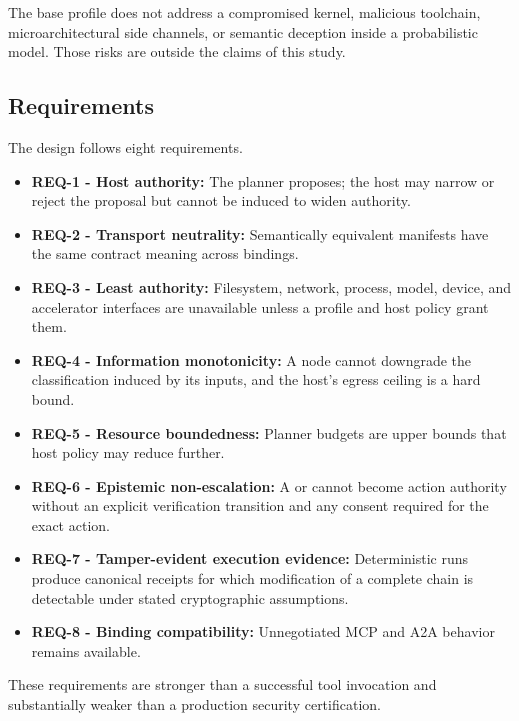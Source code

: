 The base profile does not address a compromised kernel, malicious toolchain, microarchitectural side channels, or semantic deception inside a probabilistic model. Those risks are outside the claims of this study.

\subsection{Requirements}
The design follows eight requirements.
\begin{itemize}
  \item \textbf{REQ-1 - Host authority:} The planner proposes; the host may narrow or reject the proposal but cannot be induced to widen authority.
  \item \textbf{REQ-2 - Transport neutrality:} Semantically equivalent manifests have the same contract meaning across bindings.
  \item \textbf{REQ-3 - Least authority:} Filesystem, network, process, model, device, and accelerator interfaces are unavailable unless a profile and host policy grant them.
  \item \textbf{REQ-4 - Information monotonicity:} A node cannot downgrade the classification induced by its inputs, and the host's egress ceiling is a hard bound.
  \item \textbf{REQ-5 - Resource boundedness:} Planner budgets are upper bounds that host policy may reduce further.
  \item \textbf{REQ-6 - Epistemic non-escalation:} A \claimkind{} or \hypkind{} cannot become action authority without an explicit verification transition and any consent required for the exact action.
  \item \textbf{REQ-7 - Tamper-evident execution evidence:} Deterministic runs produce canonical receipts for which modification of a complete chain is detectable under stated cryptographic assumptions.
  \item \textbf{REQ-8 - Binding compatibility:} Unnegotiated MCP and A2A behavior remains available.
\end{itemize}

These requirements are stronger than a successful tool invocation and substantially weaker than a production security certification.
